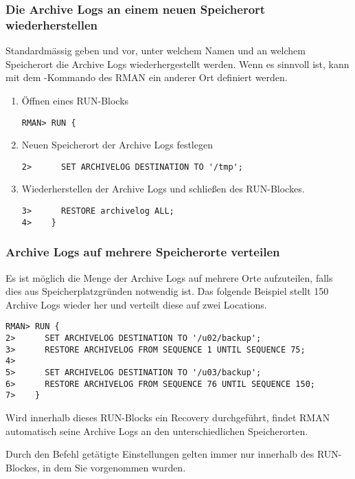         \subsubsection{Die Archive Logs an einem neuen Speicherort wiederherstellen}
          Standardm\"assig geben  und  vor, unter welchem Namen und an welchem Speicherort die Archive Logs wiederhergestellt werden. Wenn es sinnvoll ist, kann mit dem -Kommando des RMAN ein anderer Ort definiert werden.
          \begin{enumerate}
            \item \"Offnen eines RUN-Blocks
              \begin{lstlisting}[caption={Einen RUN-Block \"offnen},label=admin1488,language=rman]
RMAN> RUN {
              \end{lstlisting}
            \item Neuen Speicherort der Archive Logs festlegen
              \begin{lstlisting}[caption={Neuen Speicherort festlegen},label=admin1489,language=rman]
2>      SET ARCHIVELOG DESTINATION TO '/tmp';
              \end{lstlisting}
            \item Wiederherstellen der Archive Logs und schlie\ss{}en des RUN-Blockes.
              \begin{lstlisting}[caption={Wiederherstellen der Archive Logs},label=admin1490,language=rman]
3>      RESTORE archivelog ALL;
4>    }
              \end{lstlisting}
          \end{enumerate}
        \subsubsection{Archive Logs auf mehrere Speicherorte verteilen}
          Es ist m\"oglich die Menge der Archive Logs auf mehrere Orte aufzuteilen, falls dies aus Speicherplatzgr\"unden notwendig ist. Das folgende Beispiel stellt 150 Archive Logs wieder her und verteilt diese auf zwei Locations.
          \begin{lstlisting}[caption={Wiederherstellen der Archive Logs an verschiedenen Speicherorten},label=admin1491,language=rman]
RMAN> RUN {
2>      SET ARCHIVELOG DESTINATION TO '/u02/backup';
3>      RESTORE ARCHIVELOG FROM SEQUENCE 1 UNTIL SEQUENCE 75;
4>
5>      SET ARCHIVELOG DESTINATION TO '/u03/backup';
6>      RESTORE ARCHIVELOG FROM SEQUENCE 76 UNTIL SEQUENCE 150;
7>    }
          \end{lstlisting}
          Wird innerhalb dieses RUN-Blocks ein Recovery durchgef\"uhrt, findet RMAN automatisch seine Archive Logs an den unterschiedlichen Speicherorten.
          \begin{merke}
            Durch den Befehl  get\"atigte Einstellungen gelten immer nur innerhalb des RUN-Blockes, in dem Sie vorgenommen wurden.
          \end{merke}
